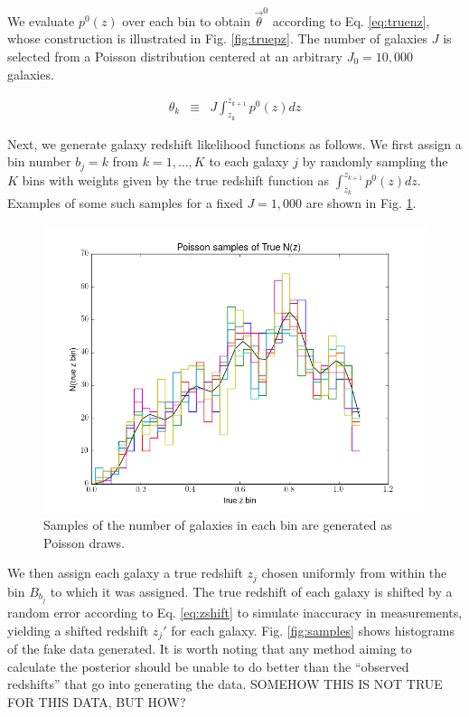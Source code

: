 \documentclass[12pt, onecolumn]{emulateapj}
\begin{document}
We evaluate $p^{0}(z)$ over each bin to obtain $\vec{\theta}^{0}$ according to Eq. \ref{eq:truenz}, whose construction is illustrated in Fig. \ref{fig:truepz}.  The number of galaxies $J$ is selected from a Poisson distribution centered at an arbitrary $J_{0}=10,000$ galaxies.

\begin{eqnarray}
\label{eq:truenz}
\theta_{k} &\equiv& J\int_{z_{k}}^{z_{k+1}}p^{0}(z) dz
\end{eqnarray}

Next, we generate galaxy redshift likelihood functions as follows.  We first assign a bin number $b_{j}=k$ from $k=1,\dots,K$ to each galaxy $j$ by randomly sampling the $K$ bins with weights given by the true redshift function as $\int_{z_{k}}^{z_{k+1}}p^{0}(z)dz$.  Examples of some such samples for a fixed $J=1,000$ are shown in Fig. \ref{fig:obsnz}.

\begin{figure}
\label{fig:obsnz}
\includegraphics[scale=0.5]{obsNz.png}
\caption{Samples of the number of galaxies in each bin are generated as Poisson draws.}
\end{figure}

We then assign each galaxy a true redshift $z_{j}$ chosen uniformly from within the bin $B_{b_{j}}$ to which it was assigned.  The true redshift of each galaxy is shifted by a random error according to Eq. \ref{eq:zshift} to simulate inaccuracy in measurements, yielding a shifted redshift $z_{j}'$ for each galaxy.  Fig. \ref{fig:samples} shows histograms of the fake data generated.  It is worth noting that any method aiming to calculate the posterior should be unable to do better than the ``observed redshifts'' that go into generating the data.  SOMEHOW THIS IS NOT TRUE FOR THIS DATA, BUT HOW?
\end{document}
